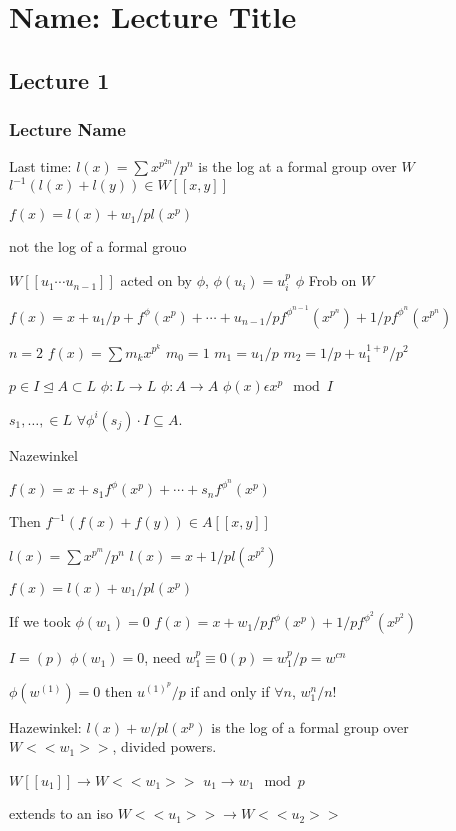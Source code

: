 \newpage
\section{Name: Lecture Title}
\subsection{Lecture 1}
\subsubsection{Lecture Name}

Last time: $l(x)= \sum x^{p^{2n}}/p^n$
is the log at a formal group over $W$
$l^{-1}(l(x)+l(y)) \in W[[x,y]]$

$f(x)= l(x) + w_1/p l(x^p)$

not the log of a formal grouo


$W[[u_1\cdots u_{n-1}]]$
acted on by $\phi$, $\phi(u_i)= u_i^p$
$\phi$ Frob on $W$

$f(x)= x + u_1/p + f^\phi(x^p) + \cdots + u_{n-1}/p f^{\phi^{n-1}}(x^{p^n}) + 1/p f^{\phi^n}(x^{p^n})$

$n=2$
$f(x)= \sum m_k x^{p^k}$
$m_0=1$
$m_1= u_1/p$
$m_2= 1/p+ u_1^{1+p}/p^2$


$p \in I \unlhd A \subset L$
$\phi: L \to L$
$\phi: A \to A$
$\phi(x) \epsilon x^p \mod I$

$s_1,\ldots, \in L$
$\forall \phi^i(s_j) \cdot I \subseteq A$. 


Nazewinkel

$f(x)= x + s_1 f^\phi(x^p) + \cdots + s_n f^{\phi^n}(x^{p})$

Then $f^{-1}(f(x) + f(y)) \in A[[x,y]]$

$l(x)= \sum x^{p^m}/p^n$
$l(x)= x + 1/p l(x^{p^2})$

$f(x)= l(x) + w_1/p l(x^p)$

If we took $\phi(w_1)=0$
$f(x)= x + w_1/p f^\phi(x^p) + 1/p f^{\phi^2}(x^{p^2})$

$I=(p)$
$\phi(w_1)=0$, need $w_1^p \equiv 0(p)= w_1^p/p = w^{cn}$

$\phi(w^{(1)})=0$
then $u^{(1)^p}/p$ if and only if $\forall n$, $w_1^n/n!$

Hazewinkel: $l(x) + w/p l(x^p)$
is the log of a formal group over $W <<w_1>>$, divided powers. 


$W[[u_1]] \to W<<w_1>>$
$u_1 \to w_1 \mod p$

extends to an iso
$W<<u_1>> \to W<<u_2>>$

